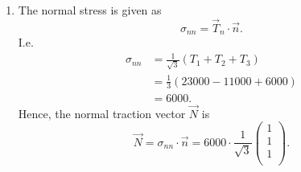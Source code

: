 \begin{derivation}
\begin{enumerate}[label=(\alph*)]
      The traction vector on the plane is:
      \begin{equation*}
        \Vec{T} = \Vec{\sigma} \Vec{n}
      \end{equation*}
      so,
      \begin{align*}
        T_1 &= \frac{1}{\sqrt{3}} \left( \num{20000} + \num{2000} + \num{1000}  \right)  = \frac{\num{23000}}{\sqrt{3}} \\
      T_2 &= \frac{1}{\sqrt{3}} \left( \num{2000} - \num{15000} + \num{2000}  \right)  = -\frac{\num{11000}}{\sqrt{3}}\\
      T_3 &= \frac{1}{\sqrt{3}} \left( \num{1000} + \num{2000} + \num{3000}   \right) = \frac{\num{6000} }{\sqrt{3}}      .\end{align*}
    \item The normal stress is given as
      \begin{equation*}
        \sigma_{nn} = \Vec{T}_n \cdot \Vec{n}
      .\end{equation*}
      I.e.
      \begin{align*}
        \sigma_{nn} &= \frac{1}{\sqrt{3}} \left( T_1 + T_2 + T_3 \right) \\
        &= \frac{1}{3} \left( \num{23000} - \num{11000} + \num{6000}  \right) \\
        &= \num{6000} 
      .\end{align*}
      Hence, the normal traction vector $\Vec{N}$ is
      \begin{equation*}
        \Vec{N} = \sigma_{nn} \cdot \Vec{n} = \num{6000} \cdot \frac{1}{\sqrt{3}} \begin{pmatrix}
          1\\
        1\\
        1\\
        \end{pmatrix}
      .\end{equation*}
      

\end{enumerate}
\end{derivation}
